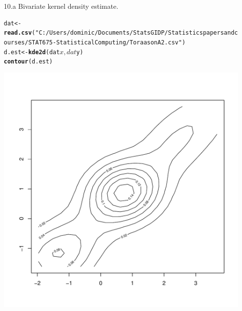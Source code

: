 \documentclass{article}\usepackage[]{graphicx}\usepackage[]{color}
\makeatletter
\def\maxwidth{ %
  \ifdim\Gin@nat@width>\linewidth
    \linewidth
  \else
    \Gin@nat@width
  \fi
}
\newcommand{\hlstr}[1]{\textcolor[rgb]{0.192,0.494,0.8}{#1}}%
\newcommand{\hlkwd}[1]{\textcolor[rgb]{0.737,0.353,0.396}{\textbf{#1}}}%
\newenvironment{kframe}{%
 \def\at@end@of@kframe{}%
 \ifinner\ifhmode%
  \def\at@end@of@kframe{\end{minipage}}%
  \begin{minipage}{\columnwidth}%
 \fi\fi%
 \def\FrameCommand##1{\hskip\@totalleftmargin \hskip-\fboxsep
 \colorbox{shadecolor}{##1}\hskip-\fboxsep
     \hskip-\linewidth \hskip-\@totalleftmargin \hskip\columnwidth}%
 \MakeFramed {\advance\hsize-\width
   \@totalleftmargin\z@ \linewidth\hsize
   \@setminipage}}%
 {\par\unskip\endMakeFramed%
 \at@end@of@kframe}
\newenvironment{knitrout}{}{} %
\makeatother
\begin{document}
\begin{itemize}
\item[10.a]  Bivariate kernel density estimate.\\

\begin{knitrout}
\color{fgcolor}\begin{kframe}
\begin{alltt}
dat <- \hlkwd{read.csv}(\hlstr{"C:/Users/dominic/Documents/StatsGIDP/Statistics papers and courses/STAT675-StatisticalComputing/ToraasonA2.csv"})
d.est <- \hlkwd{kde2d}(dat$x, dat$y)
\hlkwd{contour}(d.est)
\end{alltt}
\end{kframe}
\includegraphics[width=\maxwidth]{figure/tena1} 
\begin{kframe}\begin{alltt}


\end{alltt}
\end{kframe}
\end{knitrout}
\end{itemize}
\end{document}
